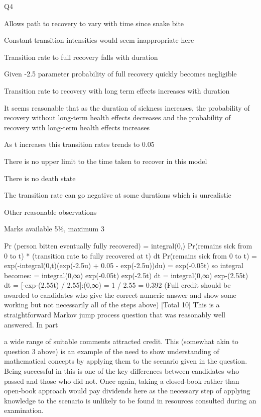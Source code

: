 \documentclass[a4paper,12pt]{article}
\begin{document}
Q4 \item  
Allows path to recovery to vary with time since snake bite \item 
Constant transition intensities would seem inappropriate here \item 
\item   Transition rate to full recovery falls with duration \item 
Given -2.5 parameter probability of full recovery quickly becomes negligible \item 
Transition rate to recovery with long term effects increases with duration \item 
It seems reasonable that as the duration of sickness increases, the probability of
recovery without long-term health effects decreases and the probability of recovery
with long-term health effects increases \item 
As t increases this transition rates trends to 0.05 \item 
There is no upper limit to the time taken to recover in this model \item 
There is no death state \item 
The transition rate can go negative at some durations which is unrealistic \item 
Other reasonable observations \item 
[Marks available 5½, maximum 3]
\item  Pr (person bitten eventually fully recovered)
= integral(0,) Pr(remains sick from 0 to t)
* (transition rate to fully recovered at t) dt 
Pr(remains sick from 0 to t) = exp(-integral(0,t)(exp(-2.5u) + 0.05 - exp(-2.5u))du) = exp(-0.05t) 
so integral becomes:
= integral(0,∞) exp(-0.05t) exp(-2.5t) dt = integral(0,∞) exp-(2.55t) dt 
= [-exp-(2.55t) / 2.55]:(0,∞) 
= 1 / 2.55 = 0.392 
\medskip 
(Full credit should be awarded to candidates who give the correct numeric answer and show some working but not necessarily all of the steps above)
[Total 10]
This is a straightforward Markov jump process question that was reasonably well answered.
In part \item   a wide range of suitable comments attracted credit. This (somewhat akin to question 3 above) is an example of the need to show understanding of mathematical concepts by applying them to the scenario given in the question. Being successful in this is one of the key differences between candidates who passed and those who did not. Once again, taking a closed-book rather than open-book approach would pay dividends here as the necessary step of applying knowledge to the scenario is unlikely to be found in resources consulted during an examination.
\end{document}
